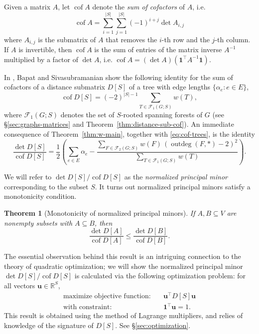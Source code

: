 \documentclass[12pt]{amsart}
\newtheorem{thm}{Theorem}[section]
\theoremstyle{definition}
\newcommand{\RR}{\mathbb{R}}
\newcommand{\bone}{\mathbf{1}}
\newcommand{\boldu}{\mathbf{u}}
\newcommand{\tr}{\intercal}
\DeclareMathOperator{\cof}{cof}
\newcommand{\trees}{\mathcal{F}_1}
\newcommand{\forests}{\mathcal{F}}
\DeclareMathOperator{\outdeg}{outdeg}
\begin{document}
Given a matrix $A$, let $\cof A$ denote the {\em sum of cofactors} of $A$, i.e. 
\begin{equation}\label{eq:cof}
	\cof A = \sum_{i = 1}^{|S|} \sum_{j = 1}^{|S|} (-1)^{i + j} \det A_{i,j} 
\end{equation}
where $A_{i,j}$ is the submatrix of $A$ that removes the $i$-th row and the $j$-th column.
If $A$ is invertible, then $\cof A$ is the sum of entries of the matrix inverse $A^{-1}$ multiplied by a factor of $\det A$, i.e. $\cof A = (\det A) (\bone^\tr A^{-1} \bone)$.

In \cite{bapat-sivasubramanian}, Bapat and Sivasubramanian show the following identity for the sum of cofactors of a distance submatrix $D[S]$ of a tree with edge lengths $\{\alpha_e \colon e \in E\}$,
\begin{equation}\label{eq:cof-trees}
	\cof D[S] = (-2)^{|S| - 1} \!\!\!\sum_{T \in \trees(G;S)} w(T) , 
\end{equation}
where $\trees(G;S)$ denotes the set of $S$-rooted spanning forests of $G$ (see \S\ref{sec:graphs-matrices} and Theorem~\ref{thm:distance-sub-cof}).
An immediate consequence of Theorem~\ref{thm:w-main}, together with \eqref{eq:cof-trees}, is the identity
\begin{equation}
\label{eq:det-cof}
	\frac{\det D[S]}{\cof D[S]} = \frac12 \left( \sum_{e \in E} \alpha_e - \frac{\sum_{F \in \forests_2(G; S)} w(F) \,(\outdeg(F,*) - 2)^2}{\sum_{T \in \trees(G; S)} w(T)} \right).
\end{equation}

We will refer to ${\det D[S]}/{\cof D[S]}$ as the {\em normalized principal minor} corresponding to the subset $S$. 
It turns out normalized principal minors satisfy a monotonicity condition.

\begin{thm}[Monotonicity of normalized principal minors]
\label{thm:monotonic}
If $A,B \subseteq V$
are nonempty subsets with
$A \subseteq B$,
then
\begin{equation*}
	\frac{\det D[A]}{\cof D[A]}  \leq \frac{\det D[B]}{\cof D[B]}.
\end{equation*}
\end{thm}

The essential observation behind this result is an intriguing connection to the theory of quadratic optimization; we will show the normalized principal minor $\det D[S] / \cof D[S]$ is calculated via the following optimization problem: for all vectors $ \boldu \in \RR^S$,
\begin{align}
	\text{maximize objective function:} &\quad \boldu^\tr D[S] \boldu \\
	\text{with constraint:} &\quad \bone^\tr \boldu = 1.
\end{align}
This result is obtained using the method of Lagrange multipliers,
and relies of knowledge of the signature of $D[S]$.
See \S\ref{sec:optimization}.
\end{document}
